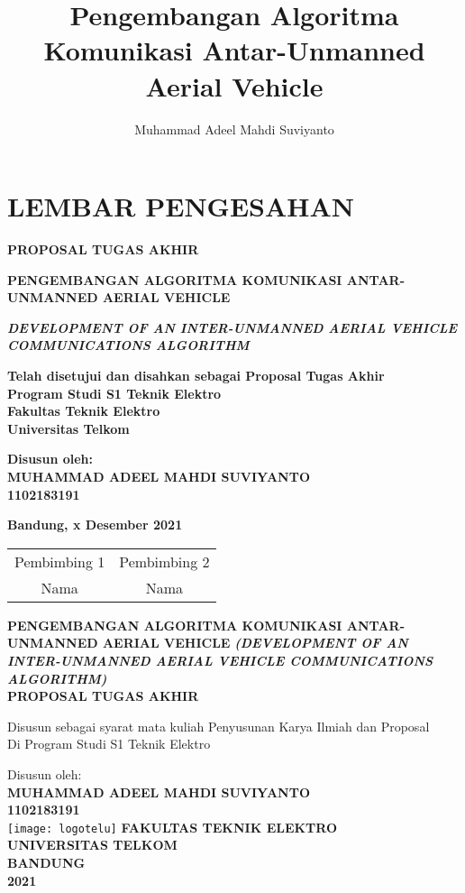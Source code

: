 \documentclass[12pt,a4paper,oneside]{book}
\author{Muhammad Adeel Mahdi Suviyanto}
\title{Pengembangan Algoritma Komunikasi Antar-Unmanned Aerial Vehicle}
\newcommand{\judulcaps}{PENGEMBANGAN ALGORITMA KOMUNIKASI ANTAR-UNMANNED AERIAL VEHICLE}
\newcommand{\judulengcaps}{DEVELOPMENT OF AN INTER-UNMANNED AERIAL VEHICLE COMMUNICATIONS ALGORITHM}
\newcommand{\prodi}{S1 Teknik Elektro}
\newcommand{\fakultas}{Fakultas Teknik Elektro}
\newcommand{\universitas}{Universitas Telkom}
\newcommand{\nim}{1102183191}
\newcommand{\NAMA}{MUHAMMAD ADEEL MAHDI SUVIYANTO}
\begin{document}
\frontmatter %
\chapter*{LEMBAR PENGESAHAN} %

\begin{center} %
\thispagestyle{empty}
\large
\textbf{PROPOSAL TUGAS AKHIR}
\bigskip

\Large
\textbf{\judulcaps}
\bigskip

\textbf{\textit{\judulengcaps}}
\bigskip
\bigskip
\bigskip

\normalsize
\textbf{Telah disetujui dan disahkan sebagai Proposal Tugas Akhir}\\
\textbf{Program Studi \prodi}\\
\textbf{\fakultas}\\
\textbf{\universitas}\\
\bigskip
\bigskip

\textbf{Disusun oleh:}\\
\textbf{\NAMA}\\
\textbf{\nim}\\
\bigskip
\bigskip

\textbf{Bandung, x Desember 2021}\\
\begin{tabular}{|c|c|}
\hline
Pembimbing 1 & Pembimbing 2 \\
Nama & Nama \\
\hline
\end{tabular}

\newpage
\thispagestyle{empty}
\Large
\textbf{\judulcaps}
\bigskip
\large
\textit{\textbf{{(\judulengcaps)}}}\\
\bigskip
\bigskip
\textbf{PROPOSAL TUGAS AKHIR}

\normalsize
Disusun sebagai syarat mata kuliah Penyusunan Karya Ilmiah dan Proposal\\
Di Program Studi \prodi

\bigskip
Disusun oleh:\\
\textbf{\NAMA}\\
\textbf{\nim}\\
\bigskip
\bigskip
\bigskip
\texttt{[image: logotelu]}
\vfill
\Large
\textbf{FAKULTAS TEKNIK ELEKTRO}\\
\large
\textbf{UNIVERSITAS TELKOM}\\
\textbf{BANDUNG}\\
\textbf{2021}
\end{center} %

\pagestyle{myheadings}




\mainmatter


\printbibliography[title={DAFTAR PUSTAKA}]
\end{document}
